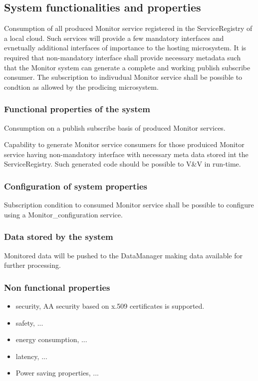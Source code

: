 \documentclass[a4paper]{arrowhead}
\begin{document}
\subsection{System functionalities and properties}
\label{sec:properties}

Consumption of all produced Monitor service registered in the
ServiceRegistry of a local cloud. Such
services will provide a few mandatory interfaces and evnetually
additional interfaces of importance to the hosting microsystem. It is
required that non-mandatory interface shall provide necessary metadata
such that the Monitor system can generate a complete and working publish subscribe
consumer. The subscription to indivudual Monitor service shall be
possible to condtion as allowed by the prodicing microsystem.




\subsubsection {Functional properties of the system}

Consumption on a publish subscribe basis of produced Monitor services.

Capability to generate Monitor service consumers for those produiced
Monitor service having non-mandatory interface with necessary meta
data stored int the ServiceRegistry. Such generated code should be
possible to V\&V in run-time.  


\subsubsection {Configuration of system properties}

Subscription condition to consumed Monitor service shall be possible
to configure using a Monitor\_configuration service.

\subsubsection {Data stored by the system}

Monitored data will be pushed to the DataManager making data available
for further processing.  

\subsubsection {Non functional properties}
\begin{itemize}
  \item security, AA security based on x.509 certificates is supported. 
  \item safety, ...
  \item energy consumption,  ...
  \item latency,  ...
  \item Power saving properties,  ... 
\end{itemize}
\end{document}
